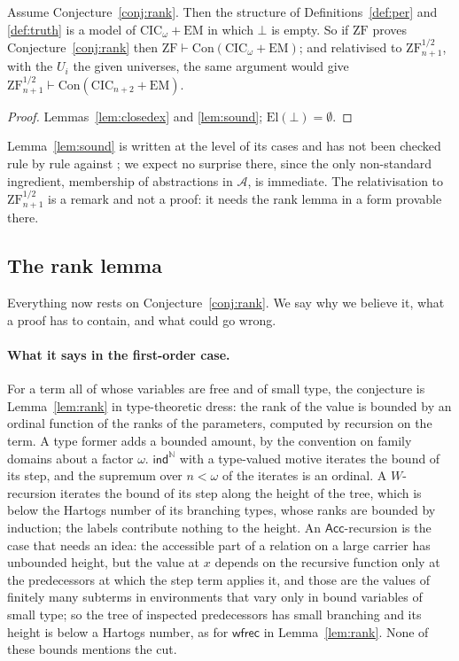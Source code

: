\documentclass[10pt]{article}
\newcommand{\N}{\mathbb{N}}
\newcommand{\CIC}{\mathrm{CIC}}
\newcommand{\ZF}{\mathrm{ZF}}
\newcommand{\ZFh}{\mathrm{ZF}^{1/2}}
\newcommand{\EM}{\mathrm{EM}}
\newcommand{\Con}{\mathrm{Con}}
\newcommand{\wfrec}{\mathsf{wfrec}}
\newcommand{\El}{\mathrm{El}}
\begin{document}
\begin{theorem}\label{thm:upper}
Assume Conjecture~\ref{conj:rank}. Then the structure of
Definitions~\ref{def:per} and \ref{def:truth} is a model of
$\CIC_\omega+\EM$ in which $\bot$ is empty. So if $\ZF$ proves
Conjecture~\ref{conj:rank} then $\ZF\vdash\Con(\CIC_\omega+\EM)$; and
relativised to $\ZFh_{n+1}$, with the $U_i$ the given universes, the same
argument would give $\ZFh_{n+1}\vdash\Con(\CIC_{n+2}+\EM)$.
\end{theorem}
\begin{proof}
Lemmas~\ref{lem:closedex} and \ref{lem:sound}; $\El(\bot)=\emptyset$.
\end{proof}

Lemma~\ref{lem:sound} is written at the level of its cases and has not
been checked rule by rule against \cite[\S2]{paper1}; we expect no
surprise there, since the only non-standard ingredient, membership of
abstractions in $\mathcal A$, is immediate. The relativisation to
$\ZFh_{n+1}$ is a remark and not a proof: it needs the rank lemma in a
form provable there.

\subsection{The rank lemma}\label{sec:ranklemma}

Everything now rests on Conjecture~\ref{conj:rank}. We say why we
believe it, what a proof has to contain, and what could go wrong.

\paragraph{What it says in the first-order case.}
For a term all of whose variables are free and of small type, the
conjecture is Lemma~\ref{lem:rank} in type-theoretic dress: the rank of
the value is bounded by an ordinal function of the ranks of the
parameters, computed by recursion on the term. A type former adds a
bounded amount, by the convention on family domains about a factor
$\omega$. $\mathsf{ind}^\N$ with a type-valued motive iterates the bound
of its step, and the supremum over $n<\omega$ of the iterates is an
ordinal. A $W$-recursion iterates the bound of its step along the
height of the tree, which is below the Hartogs number of its branching
types, whose ranks are bounded by induction; the labels contribute
nothing to the height. An $\mathsf{Acc}$-recursion is the case that
needs an idea: the accessible part of a relation on a large carrier has
unbounded height, but the value at $x$ depends on the recursive function
only at the predecessors at which the step term applies it, and those
are the values of finitely many subterms in environments that vary only
in bound variables of small type; so the tree of inspected predecessors
has small branching and its height is below a Hartogs number, as for
$\wfrec$ in Lemma~\ref{lem:rank}. None of these bounds mentions the cut.
\end{document}
